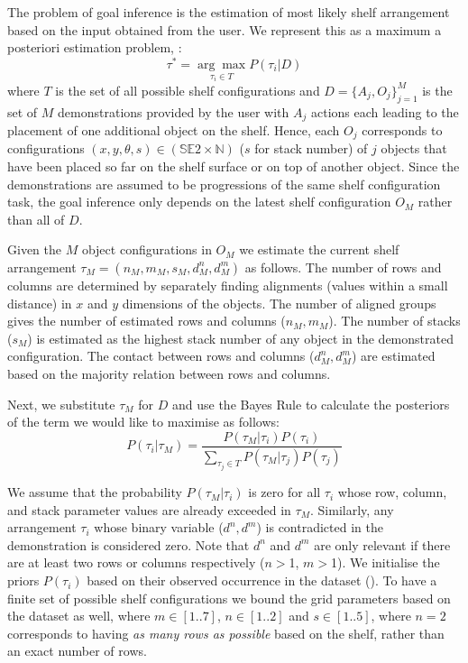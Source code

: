 The problem of goal inference is the estimation of most likely shelf arrangement based on the input obtained from the user.
We represent this as a maximum a posteriori estimation problem, \ie:
\begin{equation} \label{eqn:optimize}
\tau^* = \underset{\tau_i \in T}{\arg\max} P(\tau_i|D)
\end{equation}
where $T$ is the set of all possible shelf configurations and $D = \{ A_j, O_j \}_{j=1}^{M}$ is the set of $M$ demonstrations provided by the user with $A_j$ actions each leading to the placement of one additional object on the shelf. 
Hence, each $O_j$ corresponds to configurations $(x, y, \theta, s) \in (\mathbb{SE}2 \times \mathbb{N})$ ($s$ for stack number) of $j$ objects that have been placed so far on the shelf surface or on top of another object.
Since the demonstrations are assumed to be progressions of the same shelf configuration task, the goal inference only depends on the latest shelf configuration $O_M$ rather than all of $D$.

Given the $M$ object configurations in $O_M$ we estimate the current shelf arrangement $\tau_M = (n_M, m_M, s_M, d^n_M, d^m_M)$ as follows. 
The number of rows and columns are determined by separately finding alignments (\ie values within a small distance) in $x$ and $y$ dimensions of the objects.
The number of aligned groups gives the number of estimated rows and columns ($n_M, m_M$).
The number of stacks ($s_M$) is estimated as the highest stack number of any object in the demonstrated configuration.
The contact between rows and columns  ($d^n_M, d^m_M$) are estimated based on the majority relation between rows and columns.

Next, we substitute $\tau_M$ for $D$ and use the Bayes Rule to calculate the posteriors of the term we would like to maximise as follows:
$$P(\tau_i|\tau_M) = \frac{P(\tau_M|\tau_i)P(\tau_i)}{\underset{\tau_j \in T}{\sum} P(\tau_M|\tau_j)P(\tau_j)}$$

We assume that the probability $P(\tau_M | \tau_i)$ is zero for all $\tau_i$ whose row, column, and stack parameter values are already exceeded in $\tau_M$.
Similarly, any arrangement $\tau_i$ whose binary variable ($d^n, d^m$) is contradicted in the demonstration is considered zero.
Note that $d^n$ and $d^m$ are only relevant if there are at least two rows or columns respectively ($n$$>$1, $m$$>$1).
We initialise the priors $P(\tau_i)$ based on their observed occurrence in the dataset ().
To have a finite set of possible shelf configurations we bound the grid parameters based on the dataset as well, where $m \in [1..7]$, $n \in [1..2]$ and $s \in [1..5]$, where $n=2$ corresponds to having \textit{as many rows as possible} based on the shelf, rather than an exact number of rows.

